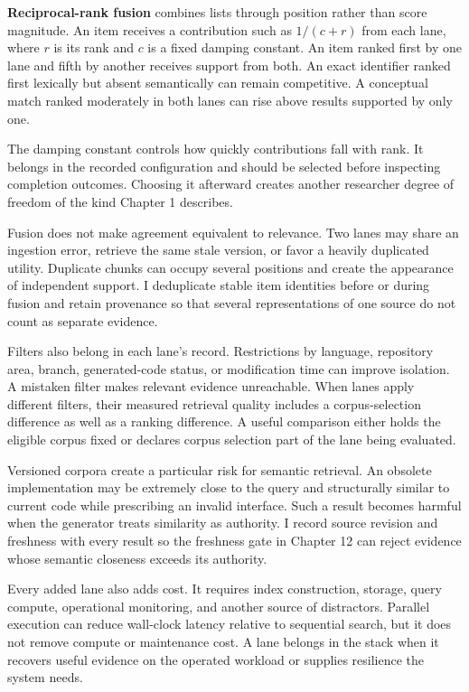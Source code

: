 \textbf{Reciprocal-rank fusion} combines lists through position rather than score magnitude. An item receives a contribution such as \(1/(c+r)\) from each lane, where \(r\) is its rank and \(c\) is a fixed damping constant. An item ranked first by one lane and fifth by another receives support from both. An exact identifier ranked first lexically but absent semantically can remain competitive. A conceptual match ranked moderately in both lanes can rise above results supported by only one.

The damping constant controls how quickly contributions fall with rank. It belongs in the recorded configuration and should be selected before inspecting completion outcomes. Choosing it afterward creates another researcher degree of freedom of the kind Chapter 1 describes.

Fusion does not make agreement equivalent to relevance. Two lanes may share an ingestion error, retrieve the same stale version, or favor a heavily duplicated utility. Duplicate chunks can occupy several positions and create the appearance of independent support. I deduplicate stable item identities before or during fusion and retain provenance so that several representations of one source do not count as separate evidence.

Filters also belong in each lane's record. Restrictions by language, repository area, branch, generated-code status, or modification time can improve isolation. A mistaken filter makes relevant evidence unreachable. When lanes apply different filters, their measured retrieval quality includes a corpus-selection difference as well as a ranking difference. A useful comparison either holds the eligible corpus fixed or declares corpus selection part of the lane being evaluated.

Versioned corpora create a particular risk for semantic retrieval. An obsolete implementation may be extremely close to the query and structurally similar to current code while prescribing an invalid interface. Such a result becomes harmful when the generator treats similarity as authority. I record source revision and freshness with every result so the freshness gate in Chapter 12 can reject evidence whose semantic closeness exceeds its authority.

Every added lane also adds cost. It requires index construction, storage, query compute, operational monitoring, and another source of distractors. Parallel execution can reduce wall-clock latency relative to sequential search, but it does not remove compute or maintenance cost. A lane belongs in the stack when it recovers useful evidence on the operated workload or supplies resilience the system needs.

